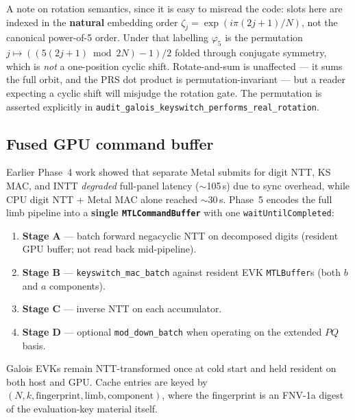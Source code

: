 \documentclass[11pt,a4paper]{article}
\DeclareRobustCommand{\code}[1]{\texttt{#1}}
\begin{document}
A note on rotation semantics, since it is easy to misread the code: slots here are
indexed in the \textbf{natural} embedding order
$\zeta_j = \exp(i\pi(2j+1)/N)$, not the canonical power-of-5 order. Under that
labelling $\varphi_5$ is the permutation
$j \mapsto ((5(2j+1) \bmod 2N) - 1)/2$ folded through conjugate symmetry, which is
\textit{not} a one-position cyclic shift. Rotate-and-sum is unaffected --- it sums
the full orbit, and the PRS dot product is permutation-invariant --- but a reader
expecting a cyclic shift will misjudge the rotation gate. The permutation is
asserted explicitly in
\code{audit\_galois\_keyswitch\_performs\_real\_rotation}.

\subsection{Fused GPU command buffer}
\label{sec:fused}

Earlier Phase~4 work showed that separate Metal submits for digit NTT, KS MAC, and
INTT \textit{degraded} full-panel latency ($\sim$105\,s) due to sync overhead,
while CPU digit NTT + Metal MAC alone reached $\sim$30\,s. Phase~5 encodes the full
limb pipeline into a \textbf{single \code{MTLCommandBuffer}} with one
\code{waitUntilCompleted}:
\begin{enumerate}
  \item \textbf{Stage A} --- batch forward negacyclic NTT on decomposed digits
        (resident GPU buffer; not read back mid-pipeline).
  \item \textbf{Stage B} --- \code{keyswitch\_mac\_batch} against resident EVK
        \code{MTLBuffer}s (both $b$ and $a$ components).
  \item \textbf{Stage C} --- inverse NTT on each accumulator.
  \item \textbf{Stage D} --- optional \code{mod\_down\_batch} when operating on the
        extended $PQ$ basis.
\end{enumerate}

Galois EVKs remain NTT-transformed once at cold start and held resident on both
host and GPU. Cache entries are keyed by
$(N, k, \mathrm{fingerprint}, \mathrm{limb}, \mathrm{component})$, where the
fingerprint is an FNV-1a digest of the evaluation-key material itself.
\end{document}

